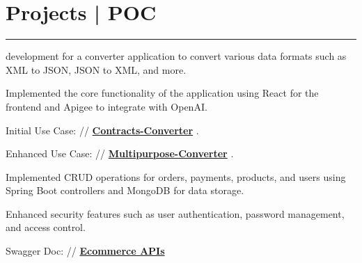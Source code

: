 \documentclass[]{deedy-resume-reversed}
\newcommand{\mysection}[2]{%
    \section{#1\hspace{0.5em}#2}
}
\begin{document}
\begin{minipage}[t]{0.60\textwidth}

\mysection{\faLightbulb  }{Projects | POC}
\rule{\textwidth}{0.4pt}
\begin{tightemize}
\item development for a converter application to convert various data formats such as XML to JSON, JSON to XML, and more.
\item Implemented the core functionality of the application using React for the frontend and Apigee to integrate with OpenAI.
\item Initial Use Case: // \href{https://contracts-converter.netlify.app/}{\bf Contracts-Converter} .
\item Enhanced Use Case: // \href{https://datamorphing.netlify.app/}{\bf Multipurpose-Converter} .
\end{tightemize}
\sectionsep

\begin{tightemize}
\item Implemented CRUD operations for orders, payments, products, and users using Spring Boot controllers and MongoDB for data storage.
\item Enhanced security features such as user authentication, password management, and access control.
\item Swagger Doc: // \href{https://ecommerceapplication-springboot-production.up.railway.app/swagger-ui.html}{\bf Ecommerce APIs}
\end{tightemize}
\sectionsep




\end{minipage}
\end{document}
